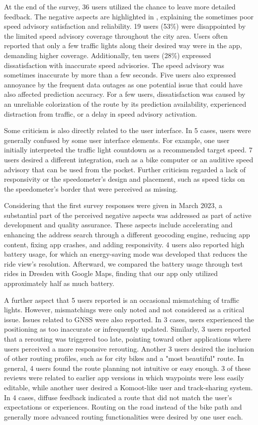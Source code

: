At the end of the survey, 36 users utilized the chance to leave more detailed feedback. The negative aspects are highlighted in , explaining the sometimes poor speed advisory satisfaction and reliability. 19 users (53\%) were disappointed by the limited speed advisory coverage throughout the city area. Users often reported that only a few traffic lights along their desired way were in the app, demanding higher coverage. Additionally, ten users (28\%) expressed dissatisfaction with inaccurate speed advisories. The speed advisory was sometimes inaccurate by more than a few seconds. Five users also expressed annoyance by the frequent data outages as one potential issue that could have also affected prediction accuracy. For a few users, dissatisfaction was caused by an unreliable colorization of the route by its prediction availability, experienced distraction from traffic, or a delay in speed advisory activation.

Some criticism is also directly related to the user interface. In 5 cases, users were generally confused by some user interface elements. For example, one user initially interpreted the traffic light countdown as a recommended target speed. 7 users desired a different integration, such as a bike computer or an auditive speed advisory that can be used from the pocket. Further criticism regarded a lack of responsivity or the speedometer's design and placement, such as speed ticks on the speedometer's border that were perceived as missing.

Considering that the first survey responses were given in March 2023, a substantial part of the perceived negative aspects was addressed as part of active development and quality assurance. These aspects include accelerating and enhancing the address search through a different geocoding engine, reducing app content, fixing app crashes, and adding responsivity. 4 users also reported high battery usage, for which an energy-saving mode was developed that reduces the ride view's resolution. Afterward, we compared the battery usage through test rides in Dresden with Google Maps, finding that our app only utilized approximately half as much battery.

A further aspect that 5 users reported is an occasional mismatching of traffic lights. However, mismatchings were only noted and not considered as a critical issue. Issues related to GNSS were also reported. In 3 cases, users experienced the positioning as too inaccurate or infrequently updated. Similarly, 3 users reported that a rerouting was triggered too late, pointing toward other applications where users perceived a more responsive rerouting. Another 3 users desired the inclusion of other routing profiles, such as for city bikes and a "most beautiful" route. In general, 4 users found the route planning not intuitive or easy enough. 3 of these reviews were related to earlier app versions in which waypoints were less easily editable, while another user desired a Komoot-like user and track-sharing system. In 4 cases, diffuse feedback indicated a route that did not match the user's expectations or experiences. Routing on the road instead of the bike path and generally more advanced routing functionalities were desired by one user each.

